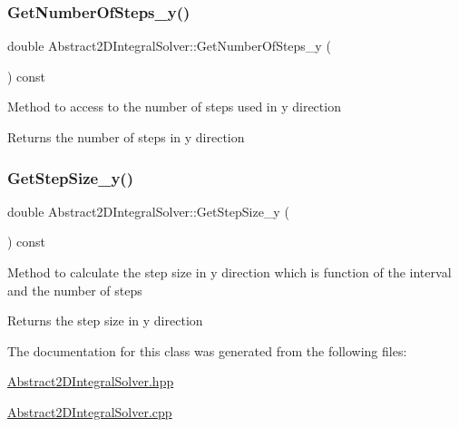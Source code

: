 \subsubsection{\texorpdfstring{Get\+Number\+Of\+Steps\+\_\+y()}{GetNumberOfSteps\_y()}}
{\footnotesize\ttfamily double Abstract2\+D\+Integral\+Solver\+::\+Get\+Number\+Of\+Steps\+\_\+y (\begin{DoxyParamCaption}{ }\end{DoxyParamCaption}) const\hspace{0.3cm}{\ttfamily [inline]}}

Method to access to the number of steps used in y direction \begin{DoxyReturn}{Returns}
the number of steps in y direction 
\end{DoxyReturn}
\mbox{\label{class_abstract2_d_integral_solver_a5c23a838a4db9b607140d4d5f03b4f79}} 
\subsubsection{\texorpdfstring{Get\+Step\+Size\+\_\+y()}{GetStepSize\_y()}}
{\footnotesize\ttfamily double Abstract2\+D\+Integral\+Solver\+::\+Get\+Step\+Size\+\_\+y (\begin{DoxyParamCaption}{ }\end{DoxyParamCaption}) const\hspace{0.3cm}{\ttfamily [inline]}}

Method to calculate the step size in y direction which is function of the interval and the number of steps \begin{DoxyReturn}{Returns}
the step size in y direction 
\end{DoxyReturn}


The documentation for this class was generated from the following files\+:\begin{DoxyCompactItemize}
\item 
\hyperlink{_abstract2_d_integral_solver_8hpp}{Abstract2\+D\+Integral\+Solver.\+hpp}\item 
\hyperlink{_abstract2_d_integral_solver_8cpp}{Abstract2\+D\+Integral\+Solver.\+cpp}\end{DoxyCompactItemize}
